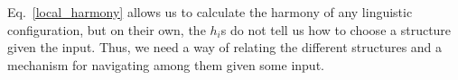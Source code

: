 \documentclass[10pt,letterpaper]{article}
\begin{document}
Eq.~\ref{local_harmony} allows us to calculate the harmony of any linguistic configuration, but on their own, the $h_i$s do not tell us how to choose a structure given the input. Thus, we need a way of relating the different structures and a mechanism for navigating among them given some input. %
\end{document}
